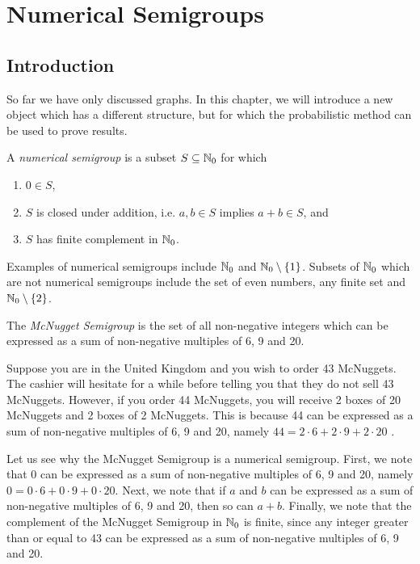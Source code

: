 \chapter{Numerical Semigroups}\label{chap:smgs}

\section{Introduction}\label{sec:smgps:intro}

So far we have only discussed graphs. In this chapter, we will introduce a new object which has a different structure, but for which the probabilistic method can be used to prove results. \par

\begin{definition} \cite{rosales2009numerical}
    A \textit{numerical semigroup} is a subset $S \subseteq \mathbb{N}_{0}$ for which 
    \begin{enumerate}
        \item $0 \in S$,
        \item $S$ is closed under addition, i.e. $a, b \in S$ implies $a + b \in S$, and
        \item $S$ has finite complement in $\mathbb{N}_{0}$.
    \end{enumerate}
\end{definition}

Examples of numerical semigroups include $\mathbb{N}_{0}$ and $\mathbb{N}_{0} \setminus \{1\}$. Subsets of $\mathbb{N}_0$ which are not numerical semigroups include the set of even numbers, any finite set and $\mathbb{N}_0 \setminus \{2\}$. \par

\begin{example}\label{ex:smgps:mcnugget}
    The \textit{McNugget Semigroup} is the set of all non-negative integers which can be expressed as a sum of non-negative multiples of 6, 9 and 20. 
\end{example}

Suppose you are in the United Kingdom and you wish to order 43 McNuggets. The cashier will hesitate for a while before telling you that they do not sell 43 McNuggets. However, if you order 44 McNuggets, you will receive 2 boxes of 20 McNuggets and 2 boxes of 2 McNuggets. This is because 44 can be expressed as a sum of non-negative multiples of 6, 9 and 20, namely $44 = 2 \cdot 6 + 2 \cdot 9 + 2 \cdot 20$ \cite{youtube}. 

Let us see why the McNugget Semigroup is a numerical semigroup. First, we note that $0$ can be expressed as a sum of non-negative multiples of 6, 9 and 20, namely $0 = 0 \cdot 6 + 0 \cdot 9 + 0 \cdot 20$. Next, we note that if $a$ and $b$ can be expressed as a sum of non-negative multiples of 6, 9 and 20, then so can $a + b$. Finally, we note that the complement of the McNugget Semigroup in $\mathbb{N}_0$ is finite, since any integer greater than or equal to 43 can be expressed as a sum of non-negative multiples of 6, 9 and 20. \par

